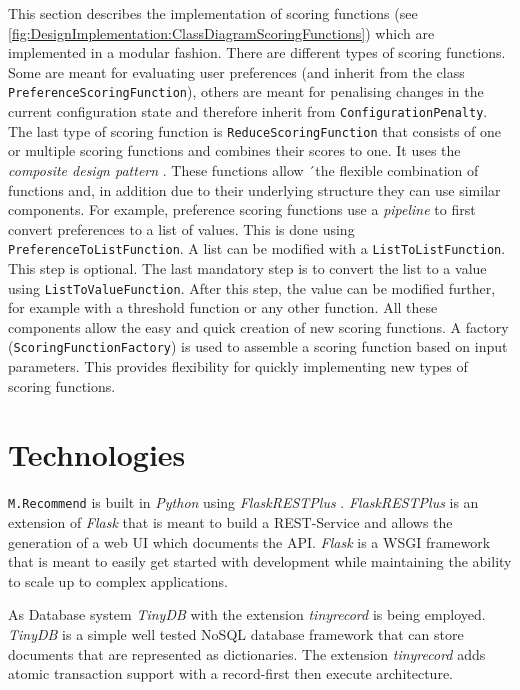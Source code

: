This section describes the implementation of scoring functions (see \autoref{fig:DesignImplementation:ClassDiagramScoringFunctions}) which are implemented in a modular fashion. There are different types of scoring functions. Some are meant for evaluating user preferences (and inherit from the class \texttt{PreferenceScoringFunction}), others are meant for penalising changes in the current configuration state and therefore inherit from  \texttt{ConfigurationPenalty}. The last type of scoring function is \texttt{ReduceScoringFunction} that consists of one or multiple scoring functions and combines their scores to one. It uses the \emph{composite design pattern} \cite{gamma2015design}. These functions allow ´the flexible combination of functions and, in addition due to their underlying structure they can use similar components. For example, preference scoring functions use a \emph{pipeline} \cite{gamma2015design} to first convert preferences to a list of values. This is done using \texttt{PreferenceToListFunction}. A list can be modified with a \texttt{ListToListFunction}. This step is optional. The last mandatory step is to convert the list to a value using \texttt{ListToValueFunction}. After this step, the value can be modified further, for example with a threshold function or any other function. All these components allow the easy and quick creation of new scoring functions. A factory (\texttt{ScoringFunctionFactory}) is used to assemble a scoring function based on input parameters. This provides flexibility for quickly implementing new types of scoring functions.

\section{Technologies}
\label{sec:DesignImplementation:Technologies}

\texttt{M.Recommend} is built in \emph{Python} \cite{PythonOrg} using \emph{FlaskRESTPlus} \cite{FlaskRESTPlus13Documentation}. \emph{FlaskRESTPlus} is an extension of \emph{Flask} \cite{FlaskDocumentation} that is meant to build a REST-Service and allows the generation of a web UI which documents the API. \emph{Flask} is a WSGI \cite{WhatWSGI} framework that is meant to easily get started with development while maintaining the ability to scale up to complex applications.

As Database system \emph{TinyDB} \cite{TinyDB15Documentation} with the extension \emph{tinyrecord} \cite{junEugeneeeoTinyrecord2020} is being employed. \emph{TinyDB} is a simple well tested NoSQL database framework that can store documents that are represented as dictionaries. The extension \emph{tinyrecord} adds atomic transaction support with a record-first then execute architecture.

